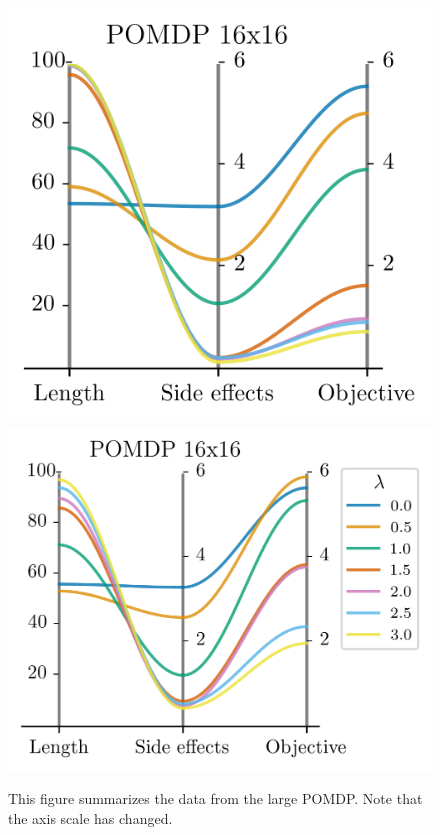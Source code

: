 \documentclass[12pt,A4]{report}
\theoremstyle{definition}
\begin{document}


\begin{figure}[H]
  \centering
  \includegraphics{"./figures/pomdp_16x16_results.png"}
  \includegraphics{"./figures/pomdp_16x16_stochastic_results.png"}
  \caption{This figure summarizes the data from the large POMDP. Note that the axis scale has changed.}
  \label{fig:results_pomdp_16x16}
\end{figure}
\end{document}
